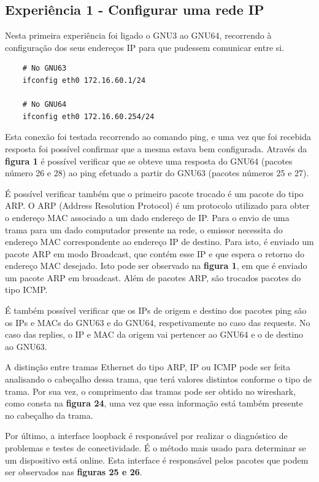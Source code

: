 \documentclass[article, a4paper, 11pt, oneside]{memoir}
\begin{document}
\subsection{Experiência 1 - Configurar uma rede IP}

Nesta primeira experiência foi ligado o GNU3 ao GNU64, recorrendo à configuração dos seus endereços IP para que pudessem comunicar entre si. 
\begin{lstlisting}
	# No GNU63
	ifconfig eth0 172.16.60.1/24

	# No GNU64
	ifconfig eth0 172.16.60.254/24
\end{lstlisting} 

Esta conexão foi testada recorrendo ao comando ping, e uma vez que foi recebida resposta foi possível confirmar que a mesma estava bem configurada. 
Através da \textbf{figura 1} é possível verificar que se obteve uma resposta do GNU64 (pacotes número 26 e 28) ao ping efetuado a partir do GNU63
(pacotes números 25 e 27).

É possível verificar também que o primeiro pacote trocado é um pacote do tipo ARP. 
O ARP (Address Resolution Protocol) é um protocolo utilizado para obter o endereço MAC associado
a um dado endereço de IP. Para o envio de uma trama para um dado computador presente na rede, o emissor
necessita do endereço MAC correspondente ao endereço IP de destino. Para isto, é enviado um pacote ARP
em modo Broadcast, que contém esse IP e que espera o retorno do endereço MAC desejado.
Isto pode ser observado na \textbf{figura 1}, em que é enviado um pacote ARP em broadcast.
Além de pacotes ARP, são trocados pacotes do tipo ICMP.

É também possível verificar que os IPs de origem e destino dos pacotes ping são os IPs e MACs do GNU63 e do GNU64, respetivamente no caso das requests.
No caso das replies, o IP e MAC da origem vai pertencer ao GNU64 e o de destino ao GNU63.

A distinção entre tramas Ethernet do tipo ARP, IP ou ICMP pode ser feita analisando o cabeçalho dessa trama, que terá valores distintos conforme o tipo de trama.
Por sua vez, o comprimento das tramas pode ser obtido no wireshark, como consta na \textbf{figura 24}, uma vez que essa informação está também presente no cabeçalho da trama.

Por último, a interface loopback é responsável por realizar o diagnóstico de problemas e testes de conectividade.
É o método mais usado para determinar se um dispositivo está online. Esta interface é responsável pelos pacotes que podem
ser observados nas \textbf{figuras 25 e 26}.
\end{document}
